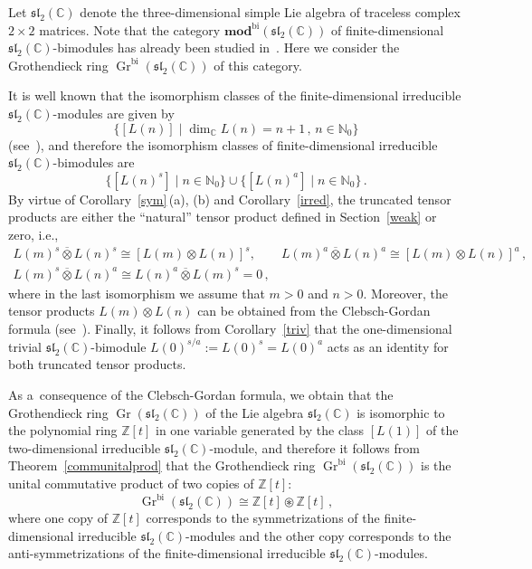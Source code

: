 \documentclass{jonasart}
\DeclareMathOperator{\bi}{bi}
\DeclareMathOperator{\K}{Gr}
\newcommand{\cbb}{\mathbb{C}}
\newcommand{\fdmod}{\mathbf{mod}}
\newcommand{\nbb}{\mathbb{N}}
\newcommand{\ovo}{\overline{\otimes}}
\newcommand{\slf}{\mathfrak{sl}}
\newcommand{\zbb}{\mathbb{Z}}
\begin{document}
	\begin{example}
		{Let $\slf_2 (\cbb)$ denote the three-dimensional simple Lie algebra of traceless complex $2\times 2$ matrices. Note that the category
		$\fdmod^{\bi} (\slf_2 (\cbb))$ of finite-dimensional $\slf_2 (\cbb)$-bimodules has already been studied in~\cite{LP2}. Here we consider the Grothendieck ring
		$\K^{\bi}(\slf_2 (\cbb))$ of this category.}

		{It is well known that the isomorphism classes of the finite-dimensional irreducible $\slf_2 (\cbb)$-modules are given by}
		\[
			\{[L(n)]\mid\dim_\cbb L(n)=n+1\,,\,n\in\nbb_0\}
		\]
		{(see~\cite[Theorem 7.2]{H}), and therefore the isomorphism classes of finite-dimensional irreducible $\slf_2 (\cbb)$-bimodules are}
		\[
			\{[L(n)^s ]\mid n\in\nbb_0\}\cup\{[L(n)^a ]\mid n\in\nbb_0\}\,.
		\]
		{By virtue of Corollary~\ref{sym}\,(a), (b) and Corollary~\ref{irred}, the truncated tensor products are either the ``natural'' tensor product defined in
		Section~\ref{weak} or zero, i.e.,}
		\begin{gather*}
			L(m)^s\ovo L(n)^s\cong[L(m)\otimes L(n)]^s,\quad\quad L(m)^a\ovo L(n)^a
			\cong[L(m)\otimes L(n)]^a\,, \\
			L(m)^s\ovo L(n)^a\cong L(n)^a\ovo L(m)^s =0\,,
		\end{gather*}
		{where in the last isomorphism we assume that $m>0$ and $n>0$. Moreover, the tensor products $L(m)\otimes L(n)$ can be obtained from the Clebsch-Gordan formula (see~\cite[Exercise~7 in Section 22]{H}). Finally, it follows from Corollary~\ref{triv} that the one-dimensional trivial $\slf_2 (\cbb)$-bimodule $L(0)^{s/a}:=
		L(0)^s =L(0)^a$ acts as an identity for both truncated tensor products.}

		{As a~consequence of the Clebsch-Gordan formula, we obtain that the
		Grothen\-dieck ring $\K(\slf_2 (\cbb))$ of the Lie algebra $\slf_2 (\cbb)$ is isomorphic to the polynomial ring $\zbb[t]$ in one variable generated by the class $[L(1)]$
		of the two-dimensional irreducible $\slf_2 (\cbb)$-module, and therefore it follows from
		Theorem~\ref{communitalprod} that the Grothendieck ring $\K^{\bi}(\slf_2 (\cbb))$
		is the unital commutative product of two copies of $\zbb[t]$:}
		\[
			\K^{\bi}(\slf_2 (\cbb))\cong\zbb[t]\circledast\zbb[t]\,,
		\]
		{where one copy of $\zbb[t]$ corresponds to the symmetrizations of the finite-dimensional irreducible $\slf_2 (\cbb)$-modules and the other copy corresponds to the anti-symmetri\-zations of the finite-dimensional irreducible
		$\slf_2 (\cbb)$-modules.}


\end{example}
\end{document}
